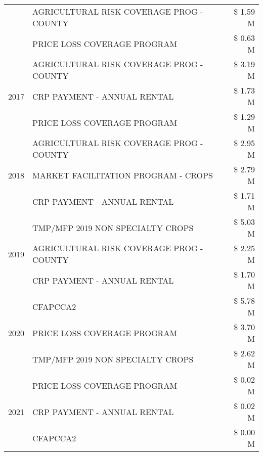 \begin{tabular}{llr}
 & AGRICULTURAL RISK COVERAGE PROG - COUNTY & \$ 1.59 M \\
 & PRICE LOSS COVERAGE PROGRAM & \$ 0.63 M \\
\cline{1-3}
\multirow[t]{3}{*}{2017} & AGRICULTURAL RISK COVERAGE PROG - COUNTY & \$ 3.19 M \\
 & CRP PAYMENT - ANNUAL RENTAL & \$ 1.73 M \\
 & PRICE LOSS COVERAGE PROGRAM & \$ 1.29 M \\
\cline{1-3}
\multirow[t]{3}{*}{2018} & AGRICULTURAL RISK COVERAGE PROG - COUNTY & \$ 2.95 M \\
 & MARKET FACILITATION PROGRAM - CROPS & \$ 2.79 M \\
 & CRP PAYMENT - ANNUAL RENTAL & \$ 1.71 M \\
\cline{1-3}
\multirow[t]{3}{*}{2019} & TMP/MFP 2019 NON SPECIALTY CROPS & \$ 5.03 M \\
 & AGRICULTURAL RISK COVERAGE PROG - COUNTY & \$ 2.25 M \\
 & CRP PAYMENT - ANNUAL RENTAL & \$ 1.70 M \\
\cline{1-3}
\multirow[t]{3}{*}{2020} & CFAPCCA2 & \$ 5.78 M \\
 & PRICE LOSS COVERAGE PROGRAM & \$ 3.70 M \\
 & TMP/MFP 2019 NON SPECIALTY CROPS & \$ 2.62 M \\
\cline{1-3}
\multirow[t]{3}{*}{2021} & PRICE LOSS COVERAGE PROGRAM & \$ 0.02 M \\
 & CRP PAYMENT - ANNUAL RENTAL & \$ 0.02 M \\
 & CFAPCCA2 & \$ 0.00 M \\
\cline{1-3}
\bottomrule
\end{tabular}
